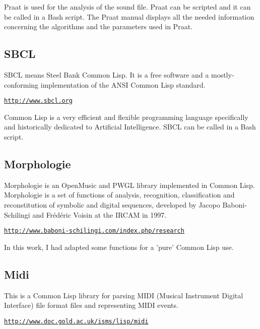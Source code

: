 Praat is used for the analysis of the sound file. Praat can be scripted and it can be called in a Bash script. The Praat manual displays all the needed information concerning the algorithms and the parameters used in Praat.

\subsection*{SBCL}

SBCL means Steel Bank Common Lisp. It is a free software and a mostly-conforming implementation of the ANSI Common Lisp standard.

\href{http://www.sbcl.org}{\texttt{\small http://www.sbcl.org}}

\bigskip

Common Lisp is a very efficient and flexible programming language specifically and historically dedicated to Artificial Intelligence.
SBCL can be called in a Bash script.

\subsection*{Morphologie}

Morphologie is an OpenMusic and PWGL library implemented in Common Lisp. Morphologie is a set of functions of analysis, recognition, classification and reconstitution of symbolic and digital sequences, developed by Jacopo Baboni-Schilingi and Fr\'ed\'eric Voisin at the IRCAM in 1997.

\href{http://www.baboni-schilingi.com/index.php/research}{\texttt{\small http://www.baboni-schilingi.com/index.php/research}}


\bigskip

In this work, I had adapted some functions for a 'pure' Common Lisp use.

\subsection*{Midi}

This is a Common Lisp library for parsing MIDI (Musical Instrument Digital Interface) file format files and representing MIDI events.

\href{http://www.doc.gold.ac.uk/isms/lisp/midi}{\texttt{\small http://www.doc.gold.ac.uk/isms/lisp/midi}}

